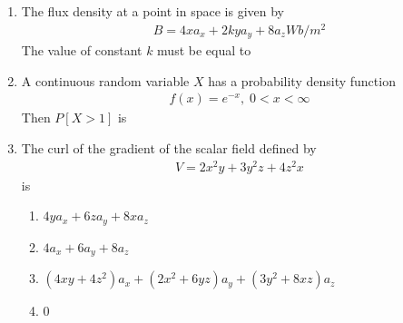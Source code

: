 \documentclass[journal,12pt,onecolumn]{IEEEtran}
\theoremstyle{remark}
\begin{document}
\begin{enumerate}
  \item The flux density at a point in space is given by 
  \begin{align*}
      B = 4x a_x + 2k y a_y + 8 a_z  Wb/m^2
  \end{align*}
  The value of constant $k$ must be equal to  
  \begin{enumerate}
  \end{enumerate}

  \item A continuous random variable $X$ has a probability density function 
  \begin{align*}
      f(x) = e^{-x}, \; 0 < x < \infty
  \end{align*}
  Then $P[X > 1]$ is  
  \begin{enumerate}
  \end{enumerate}

  \item The curl of the gradient of the scalar field defined by 
  \begin{align*}
      V = 2x^2 y + 3y^2 z + 4z^2 x
  \end{align*}is  
  \begin{enumerate}
    \item $4y a_x + 6z a_y + 8x a_z$  
    \item $4a_x + 6a_y + 8a_z$  
    \item $(4xy + 4z^2) a_x + (2x^2 + 6yz) a_y + (3y^2 + 8xz) a_z$  
    \item 0  
  \end{enumerate}


\end{enumerate}
\end{document}
